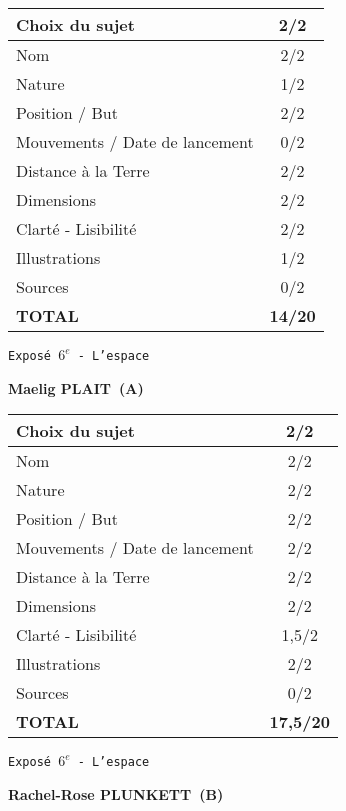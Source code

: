 	\vspace*{2cm}
	\begin{tabular}{|l|c|}
		\hline
		Choix du sujet & 2/2 \\
		\hline
		Nom & 2/2 \\
		\hline
		Nature & 1/2 \\
		\hline
		Position / But & 2/2 \\
		\hline
		Mouvements / Date de lancement & 0/2 \\
		\hline
		Distance \`a la Terre & 2/2 \\
		\hline
		Dimensions & 2/2 \\
		\hline
		Clart\'e - Lisibilit\'e & 2/2 \\
		\hline
		Illustrations & 1/2 \\
		\hline
		Sources & 0/2 \\
		\hline
		\textbf{TOTAL}  & \textbf{14/20} \\
		\hline
	\end{tabular}
	\newline
	\LARGE{\texttt{Expos\'e $6^e$ - L'espace}}
	\vspace*{1cm}

	\textbf{Maelig PLAIT\ (A)}

	\vspace*{2cm}
	\begin{tabular}{|l|c|}
		\hline
		Choix du sujet & 2/2 \\
		\hline
		Nom & 2/2 \\
		\hline
		Nature & 2/2 \\
		\hline
		Position / But & 2/2 \\
		\hline
		Mouvements / Date de lancement & 2/2 \\
		\hline
		Distance \`a la Terre & 2/2 \\
		\hline
		Dimensions & 2/2 \\
		\hline
		Clart\'e - Lisibilit\'e & 1,5/2 \\
		\hline
		Illustrations & 2/2 \\
		\hline
		Sources & 0/2 \\
		\hline
		\textbf{TOTAL}  & \textbf{17,5/20} \\
		\hline
	\end{tabular}
	\newline
	\LARGE{\texttt{Expos\'e $6^e$ - L'espace}}
	\vspace*{1cm}

	\textbf{Rachel-Rose PLUNKETT\ (B)}

